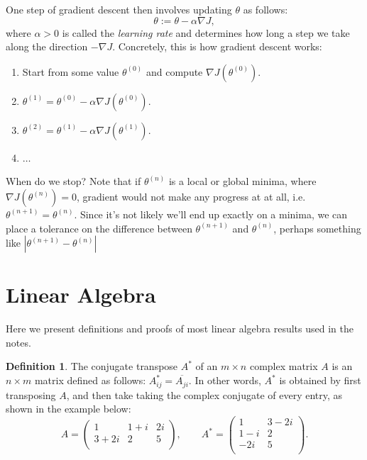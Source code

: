 \documentclass{article}
\theoremstyle{definition}
\newtheorem{definition}{Definition}[section]
\begin{document}
One step of gradient descent then involves updating $\theta$ as follows:
\begin{equation}
    \theta := \theta - \alpha \nabla J,
\end{equation}
where $\alpha > 0$ is called the \textit{learning rate} and determines how long a step we take along the direction $-\nabla J$. Concretely, this is how gradient descent works:
\begin{enumerate}
    \item Start from some value $\theta^{(0)}$ and compute $\nabla J(\theta^{(0)})$.
    \item $\theta^{(1)}=\theta^{(0)}-\alpha\nabla J(\theta^{(0)})$.
    \item $\theta^{(2)}=\theta^{(1)}-\alpha\nabla J(\theta^{(1)})$.
    \item $\dots$
\end{enumerate}
When do we stop? Note that if $\theta^{(n)}$ is a local or global minima, where $\nabla J(\theta^{(n)})=0$, gradient would not make any progress at at all, i.e. $\theta^{(n+1)}=\theta^{(n)}$. Since it's not likely we'll end up exactly on a minima, we can place a tolerance on the difference between $\theta^{(n+1)}$ and $\theta^{(n)}$, perhaps something like $|\theta^{(n+1)} - \theta^{(n)}|$


\newpage
\appendix
\section{Linear Algebra}
Here we present definitions and proofs of most linear algebra results used in the notes.
\begin{definition}
The conjugate transpose $A^*$ of an $m\times n$ complex matrix $A$ is an $n \times m$ matrix defined as follows: $A^*_{ij}=\overline{A_{ji}}$. In other words, $A^*$ is obtained by first transposing $A$, and then take taking the complex conjugate of every entry, as shown in the example below:
\begin{equation}
    A =
    \begin{pmatrix}
        1 & 1+i & 2i \\
        3+2i & 2 & 5 \\
    \end{pmatrix},
    \qquad
    A^* =
    \begin{pmatrix}
        1 & 3-2i \\
        1-i & 2 \\
        -2i & 5 \\
    \end{pmatrix}.
\end{equation}
\end{definition}
\end{document}
